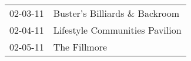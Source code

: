 \begin{supertabular}{p{0.07\textwidth}p{0.23\textwidth}}
 02-03-11 &   Buster's Billiards \& Backroom \\
 02-04-11 &  Lifestyle Communities Pavilion \\
 02-05-11 &                    The Fillmore \\
\end{supertabular}
